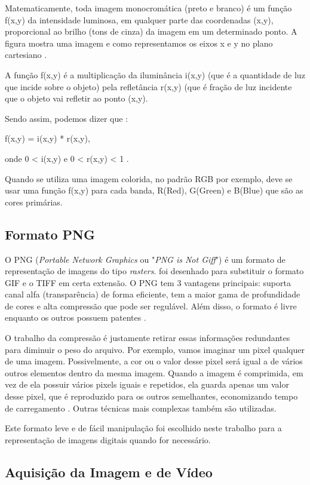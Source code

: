 Matematicamente, toda imagem monocromática (preto e branco) é um função f(x,y) da intensidade luminosa, em qualquer parte das coordenadas (x,y), proporcional ao brilho (tons de cinza) da imagem em um determinado ponto. A figura mostra uma imagem e como representamos os eixos x e y no plano cartesiano \cite{gonzalez_woods}. 

A função  f(x,y)  é a multiplicação da iluminância  i(x,y) (que é a quantidade de luz que incide sobre o objeto) pela refletância  r(x,y)  (que é fração de luz incidente que o objeto vai refletir ao ponto (x,y). 

Sendo assim, podemos dizer que :

f(x,y) = i(x,y) * r(x,y),

onde 0 < i(x,y) e 0 < r(x,y) < 1 .

Quando se utiliza uma imagem colorida, no padrão RGB por exemplo,  deve se usar uma função f(x,y) para cada banda, R(Red), G(Green) e B(Blue) que são as cores primárias\cite{gonzalez_woods}.


\subsection{Formato PNG}\label{subsec:png}

O PNG (\textit{Portable Network Graphics} ou "\textit{PNG is Not Giff}") é um formato de representação de imagens do tipo \textit{rasters}. foi desenhado para substituir o formato GIF e o TIFF em certa extensão. O PNG tem 3 vantagens principais: suporta canal alfa (transparência) de forma eficiente, tem a maior gama de profundidade de cores e alta compressão que pode ser regulável. Além disso, o formato é livre enquanto os outros possuem patentes \cite{png}. 

O trabalho da compressão é justamente retirar essas informações redundantes para diminuir o peso do arquivo. Por exemplo, vamos imaginar um pixel qualquer de uma imagem. Possivelmente, a cor ou o valor desse pixel será igual a de vários outros elementos dentro da mesma imagem. Quando a imagem é comprimida, em vez de ela possuir vários pixels iguais e repetidos, ela guarda apenas um valor desse pixel, que é reproduzido para os outros semelhantes, economizando tempo de carregamento \cite{img_compact}. Outras técnicas mais complexas também são utilizadas.

Este formato leve e de fácil manipulação foi escolhido neste trabalho para a representação de imagens digitais quando for necessário.


\subsection{Aquisição da Imagem e de Vídeo}\label{subsec:aquisicao_video}

